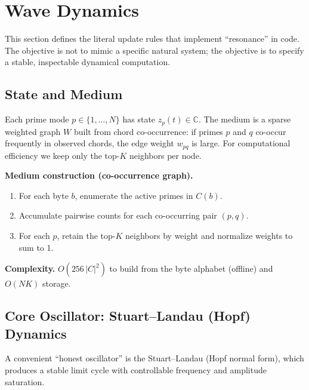 \documentclass[11pt,a4paper]{article}
\newcommand{\C}{\mathbb{C}}
\newcommand{\z}{z}                %
\begin{document}




\section{Wave Dynamics}
\label{sec:dynamics}
\label{subsec:omega_dynamics}%
\label{subsec:kuramoto}%

This section defines the literal update rules that implement ``resonance'' in code. The objective is not to mimic a specific natural system; the objective is to specify a stable, inspectable dynamical computation.

\subsection{State and Medium}
Each prime mode $p\in\{1,\dots,N\}$ has state $\z_p(t)\in\C$. The medium is a sparse weighted graph $W$ built from chord co-occurrence: if primes $p$ and $q$ co-occur frequently in observed chords, the edge weight $w_{pq}$ is large. For computational efficiency we keep only the top-$K$ neighbors per node.

\begin{algobox}
\textbf{Medium construction (co-occurrence graph).}
\begin{enumerate}[nosep]
  \item For each byte $b$, enumerate the active primes in $C(b)$.
  \item Accumulate pairwise counts for each co-occurring pair $(p,q)$.
  \item For each $p$, retain the top-$K$ neighbors by weight and normalize weights to sum to 1.
\end{enumerate}
\textbf{Complexity.} $O(256\,|C|^2)$ to build from the byte alphabet (offline) and $O(NK)$ storage.
\end{algobox}

\subsection{Core Oscillator: Stuart--Landau (Hopf) Dynamics}
\label{subsec:hopf}

A convenient ``honest oscillator'' is the Stuart--Landau (Hopf normal form), which produces a stable limit cycle with controllable frequency and amplitude saturation.
\end{document}
